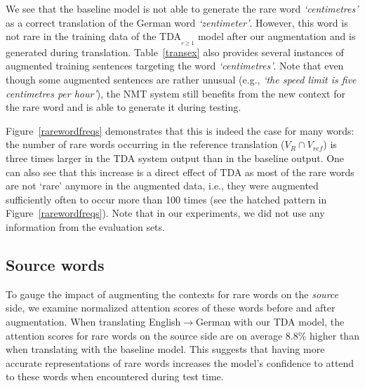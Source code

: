 We see that the baseline model is not able to generate the rare word \textit{`centimetres'} as a correct translation of the German word \textit{`zentimeter'}. However, this word is not rare in the training data of the TDA\textsubscript{$_{r\ge 1}$} model after our augmentation and is generated during translation. Table~\ref{transex} also provides several instances of augmented training sentences targeting the word \textit{`centimetres'}. Note that even though some augmented sentences are rather unusual (e.g., \textit{`the speed limit is five centimetres per hour'}), the NMT system still benefits from the new context for the rare word and is able to generate it during testing.

Figure~\ref{rarewordfreqs} demonstrates that this is indeed the case for many words: the number of rare words occurring in the reference translation ($V_R \cap V_{ref}$) is three times larger in the TDA system output than in the baseline output. 
One can also see that this increase is a direct effect of TDA
as most of the rare words are not `rare' anymore in the augmented data, i.e., they were augmented sufficiently often to occur more than 100 times (see the hatched pattern in Figure~\ref{rarewordfreqs}).
Note that in our experiments, we did not use any information from the evaluation sets.



\subsection{Source words}  

To gauge the impact of augmenting the contexts for rare words on the \textit{source} side, we examine normalized attention scores of these words before and after augmentation. When translating English$\rightarrow$German 
with our TDA model, the attention scores for rare words on the source side are on average 8.8\% higher than when translating with the baseline model. This suggests that having more accurate representations of rare words increases the model's confidence to attend to these words when encountered during test time.


